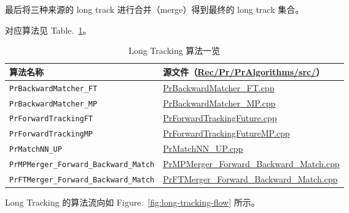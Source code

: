 \documentclass[UTF8]{article}
\begin{document}
最后将三种来源的 long track 进行合并（merge）得到最终的 long track 集合。

对应算法见 Table.~\ref{tab:long-algos}。

\begin{table}[htbp]
  \centering
  \caption{Long Tracking 算法一览}
  \label{tab:long-algos}
  \begin{tabular}{ll}
    \toprule
    算法名称 & 源文件（\url{Rec/Pr/PrAlgorithms/src/}） \\
    \midrule
    \texttt{PrBackwardMatcher\_FT} & \url{PrBackwardMatcher_FT.cpp} \\
    \texttt{PrBackwardMatcher\_MP} & \url{PrBackwardMatcher_MP.cpp} \\
    \texttt{PrForwardTrackingFT}  & \url{PrForwardTrackingFuture.cpp} \\
    \texttt{PrForwardTrackingMP}  & \url{PrForwardTrackingFutureMP.cpp} \\
    \texttt{PrMatchNN\_UP}        & \url{PrMatchNN_UP.cpp} \\
    \texttt{PrMPMerger\_Forward\_Backward\_Match} & \url{PrMPMerger_Forward_Backward_Match.cpp} \\
    \texttt{PrFTMerger\_Forward\_Backward\_Match} & \url{PrFTMerger_Forward_Backward_Match.cpp} \\
    \bottomrule
  \end{tabular}
\end{table}

Long Tracking 的算法流向如 Figure.~\ref{fig:long-tracking-flow} 所示。
\end{document}
